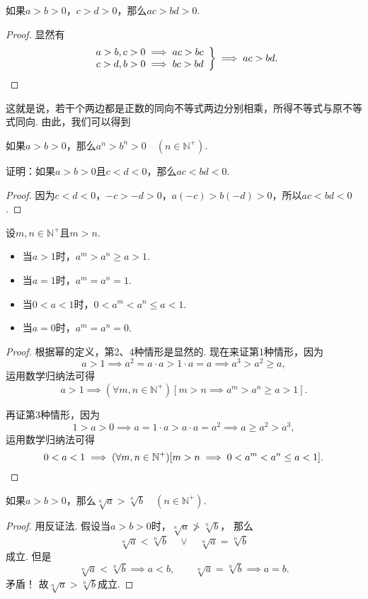 \begin{corollary}
如果\(a>b>0\)，\(c>d>0\)，那么\(ac>bd>0\).
\begin{proof}
显然有\[
\left. \begin{array}{r}
a>b,c>0 \implies ac>bc \\
c>d,b>0 \implies bc>bd
\end{array} \right\}
\implies ac>bd.
\qedhere
\]
\end{proof}
\end{corollary}
这就是说，若干个两边都是正数的同向不等式两边分别相乘，所得不等式与原不等式同向.
由此，我们可以得到
\begin{corollary}
如果\(a>b>0\)，那么\(a^n>b^n>0 \quad (n\in\mathbb{N}^+)\).
\end{corollary}

\begin{example}
证明：如果\(a > b > 0\)且\(c < d < 0\)，那么\(ac < bd < 0\).
\begin{proof}
因为\(c < d < 0\)，\(-c > -d > 0\)，\(a(-c) > b(-d) > 0\)，所以\(ac < bd < 0\).
\end{proof}
\end{example}

\begin{corollary}\label{theorem:不等式.正整数次幂的序}
设\(m,n\in\mathbb{N}^+\)且\(m>n\).
\begin{itemize}
	\item 当\(a>1\)时，\(a^m > a^n \geq a > 1\).
	\item 当\(a=1\)时，\(a^m = a^n = 1\).
	\item 当\(0<a<1\)时，\(0 < a^m < a^n \leq a < 1\).
	\item 当\(a=0\)时，\(a^m = a^n = 0\).
\end{itemize}
\begin{proof}
根据幂的定义，第2、4种情形是显然的.
现在来证第1种情形，因为\[
	a > 1
	\implies
	a^2 = a \cdot a > 1 \cdot a = a
	\implies
	a^3 > a^2 \geq a,
\]
运用数学归纳法可得\[
	a>1
	\implies
	(\forall m,n\in\mathbb{N}^+)
	[m>n \implies a^m > a^n \geq a > 1].
\]

再证第3种情形，因为\[
	1>a>0
	\implies
	a = 1 \cdot a > a \cdot a = a^2
	\implies
	a \geq a^2 > a^3,
\]
运用数学归纳法可得\[
	0<a<1
	\implies
	(\forall m,n\in\mathbb{N}^+)
	[m>n \implies 0 < a^m < a^n \leq a < 1].
	\qedhere
\]
\end{proof}
\end{corollary}

\begin{theorem}
如果\(a>b>0\)，那么\(\sqrt[n]{a} > \sqrt[n]{b} \quad (n\in\mathbb{N}^+)\).
\begin{proof}
用反证法.
假设当\(a>b>0\)时，\(\sqrt[n]{a} \ngtr \sqrt[n]{b}\)，
那么\[
	\sqrt[n]{a} < \sqrt[n]{b}
	\quad\lor\quad
	\sqrt[n]{a} = \sqrt[n]{b}
\]成立.
但是\[
	\sqrt[n]{a} < \sqrt[n]{b} \implies a<b,
	\qquad
	\sqrt[n]{a} = \sqrt[n]{b} \implies a=b.
\]矛盾！
故\(\sqrt[n]{a}>\sqrt[n]{b}\)成立.
\end{proof}
\end{theorem}

